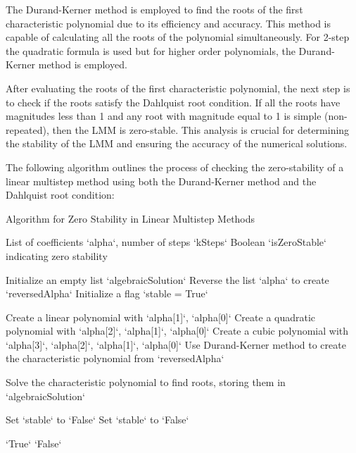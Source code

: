 \documentclass[a4paper, twoside]{report} %
\begin{document}
	\newpage
	The Durand-Kerner method is employed to find the roots of the first characteristic polynomial due to its efficiency and accuracy. This method is capable of calculating all the roots of the polynomial simultaneously. For 2-step the quadratic formula is used but for higher order polynomials, the Durand-Kerner method is employed.

	After evaluating the roots of the first characteristic polynomial, the next step is to check if the roots satisfy the Dahlquist root condition. If all the roots have magnitudes less than 1 and any root with magnitude equal to 1 is simple (non-repeated), then the LMM is zero-stable. This analysis is crucial for determining the stability of the LMM and ensuring the accuracy of the numerical solutions.

	The following algorithm outlines the process of checking the zero-stability of a linear multistep method using both the Durand-Kerner method and the Dahlquist root condition:

	\begin{algorithm}
		\caption{Algorithm for Zero Stability in Linear Multistep Methods}
		\label{alg:zero_stability}

		\begin{algorithmic}[1] %

			\REQUIRE List of coefficients `alpha`, number of steps `kSteps`
			\ENSURE Boolean `isZeroStable` indicating zero stability

			\STATE Initialize an empty list `algebraicSolution`
			\STATE Reverse the list `alpha` to create `reversedAlpha`
			\STATE Initialize a flag `stable = True`

			\STATE Create a linear polynomial with `alpha[1]`, `alpha[0]`
			\STATE Create a quadratic polynomial with `alpha[2]`, `alpha[1]`, `alpha[0]`
			\STATE Create a cubic polynomial with `alpha[3]`, `alpha[2]`, `alpha[1]`, `alpha[0]`
			\ELSE
			\STATE Use Durand-Kerner method to create the characteristic polynomial from `reversedAlpha`
			\ENDIF

			\STATE Solve the characteristic polynomial to find roots, storing them in `algebraicSolution`

			\STATE Set `stable` to `False`
			\STATE Set `stable` to `False`
			\ENDIF
			\ENDFOR

			\RETURN `True`
			\ELSE
			\RETURN `False`
			\ENDIF

		\end{algorithmic}
	\end{algorithm}
\end{document}
